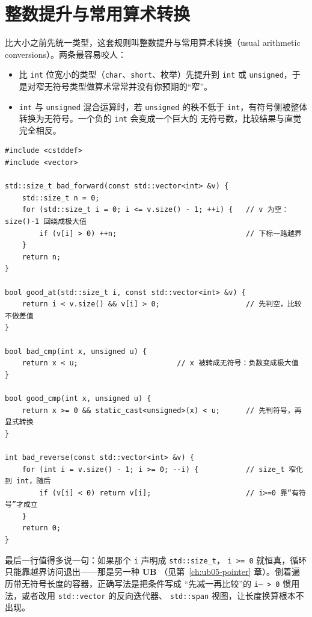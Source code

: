 \documentclass[12pt,a4paper,fontset=fandol]{ctexbook}
\newcommand{\Tp}[1]{\texttt{#1}}
\newcommand{\UB}{\textbf{\textsf{UB}}}
\begin{document}
\section{整数提升与常用算术转换}\label{sec:ub09-promotions}

比大小之前先统一类型，这套规则叫整数提升与常用算术转换（usual arithmetic
conversions）。两条最容易咬人：

\begin{itemize}
  \item 比 \Tp{int} 位宽小的类型（\Tp{char}、\Tp{short}、枚举）先提升到 \Tp{int}
        或 \Tp{unsigned}，于是对窄无符号类型做算术常常并没有你预期的“窄”。
  \item \Tp{int} 与 \Tp{unsigned} 混合运算时，若 \Tp{unsigned} 的秩不低于
        \Tp{int}，有符号侧被整体转换为无符号。一个负的 \Tp{int} 会变成一个巨大的
        无符号数，比较结果与直觉完全相反。
\end{itemize}

\begin{lstlisting}[style=cppstyle, caption={反例与修法：size\_t 循环、有符号与无符号比较}]
#include <cstddef>
#include <vector>

std::size_t bad_forward(const std::vector<int> &v) {
    std::size_t n = 0;
    for (std::size_t i = 0; i <= v.size() - 1; ++i) {   // v 为空：size()-1 回绕成极大值
        if (v[i] > 0) ++n;                              // 下标一路越界
    }
    return n;
}

bool good_at(std::size_t i, const std::vector<int> &v) {
    return i < v.size() && v[i] > 0;                    // 先判空，比较不做差值
}

bool bad_cmp(int x, unsigned u) {
    return x < u;                       // x 被转成无符号：负数变成极大值
}

bool good_cmp(int x, unsigned u) {
    return x >= 0 && static_cast<unsigned>(x) < u;      // 先判符号，再显式转换
}

int bad_reverse(const std::vector<int> &v) {
    for (int i = v.size() - 1; i >= 0; --i) {           // size_t 窄化到 int，随后
        if (v[i] < 0) return v[i];                      // i>=0 靠“有符号”才成立
    }
    return 0;
}
\end{lstlisting}

最后一行值得多说一句：如果那个 \Tp{i} 声明成 \Tp{std::size\_t}，
\Tp{i >= 0} 就恒真，循环只能靠越界访问退出——那是另一种 \UB{}
（见第~\ref{ch:ub05-pointer} 章）。倒着遍历带无符号长度的容器，正确写法是把条件写成
“先减一再比较”的 \Tp{i-- > 0} 惯用法，或者改用 \Tp{std::vector} 的反向迭代器、
\Tp{std::span} 视图，让长度换算根本不出现。
\end{document}
